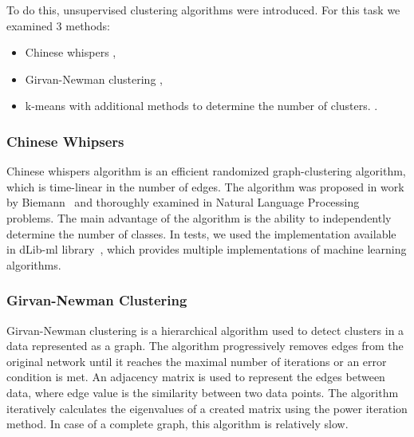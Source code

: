 To do this, unsupervised clustering algorithms were introduced. 
For this task we examined 3 methods:
\begin{itemize}
\item Chinese whispers \cite{CW1, CW2},
\item Girvan-Newman clustering \cite{Newman},
\item k-means with additional methods to determine the number of clusters. \cite{kmeans1, kmeans2}.
\end{itemize}

\subsubsection*{Chinese Whipsers}
Chinese whispers algorithm is an efficient randomized graph-clustering algorithm, which is time-linear in the number of edges.
The algorithm was proposed in work by Biemann~\cite{CW1} and thoroughly examined in Natural Language Processing problems. 
The main advantage of the algorithm is the ability to independently determine the number of classes. 
In tests, we used the implementation available in dLib-ml library~\cite{dlib}, which provides multiple implementations of machine learning algorithms.

\subsubsection*{Girvan-Newman Clustering}
Girvan-Newman clustering is a hierarchical algorithm used to detect clusters in a data represented as a graph.
The algorithm progressively removes edges from the original network until it reaches the maximal number of iterations or an error condition is met.
An adjacency matrix is used to represent the edges between data, where edge value is the similarity between two data points.
The algorithm iteratively calculates the eigenvalues of a created matrix using the power iteration method. 
In case of a complete graph, this algorithm is relatively slow.

